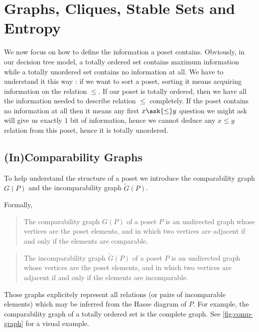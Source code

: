 \section{Graphs, Cliques, Stable Sets and Entropy}
\label{tree:poset:graph}

We now focus on how to define the information a poset contains. Obviously, in
our decision tree model, a totally ordered set contains maximum information
while a totally unordered set contains no information at all. We have to
understand it this way : if we want to sort a poset, sorting it means acquiring
information on the relation $\le$. If our poset is totally ordered, then we
have all the information needed to describe relation $\le$ completely. If the
poset contains no information at all then it means any first $x
\ask{\le} y$ question we might ask will give us exactly $1$ bit of
information, hence we cannot deduce any $x \le y$ relation from this poset,
hence it is totally unordered.

\subsection*{(In)Comparability Graphs}

To help understand the structure of a poset we introduce the comparability
graph ${G}(P)$ and the incomparability graph $\widetilde{G}(P)$.

Formally,

\begin{quotation}
The comparability graph ${G}(P)$ of a poset $P$ is an undirected graph whose
vertices are the poset elements, and in which two vertices are adjacent if and
only if the elements are comparable.
\end{quotation}

\begin{quotation}
The incomparability graph $\widetilde{G}(P)$ of a poset $P$ is an undirected
graph whose vertices are the poset elements, and in which two vertices are
adjacent if and only if the elements are incomparable.
\end{quotation}



Those graphs explicitely represent all relations (or pairs of incomparable
elements) which may be inferred from the Hasse diagram of ${P}$. For example,
the comparability graph of a totally ordered set is the complete graph. See
\ref{fig:comp-graph} for a visual example.




